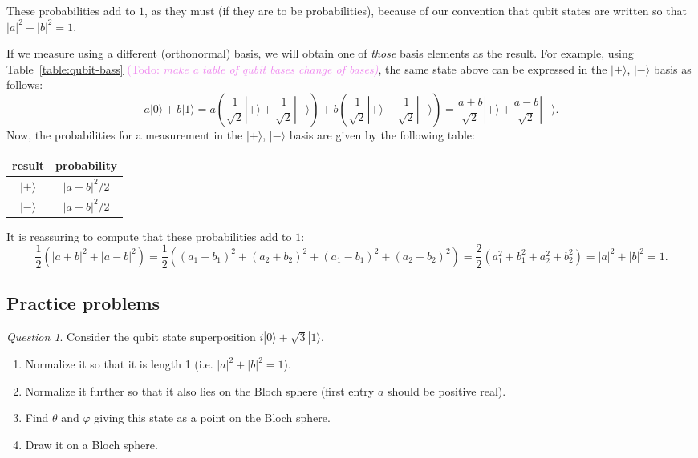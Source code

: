 \documentclass{article}
\theoremstyle{plain}
\theoremstyle{definition}
\theoremstyle{remark}
\newtheorem{question}[theorem]{Question}
\numberwithin{theorem}{section}
\newcommand{\KS}[1]{\textcolor{violet}{{\sf (Todo:} {\sl{#1})}}}
\newcommand{\KS}[1]{}
\begin{document}
These probabilities add to $1$, as they must (if they are to be probabilities), because of our convention that qubit states are written so that $|a|^2 + |b|^2 = 1$.

If we measure using a different (orthonormal) basis, we will obtain one of \emph{those} basis elements as the result.  For example, using Table~\ref{table:qubit-bass} \KS{make a table of qubit bases change of bases}, the same state above can be expressed in the $|+\rangle$, $|-\rangle$ basis as follows:
\[
a | 0 \rangle + b | 1 \rangle = 
a\left(  \frac{1}{\sqrt{2} }|+\rangle + \frac{1}{\sqrt{2}} |-\rangle \right) +
b\left(  \frac{1}{\sqrt{2} }|+\rangle - \frac{1}{\sqrt{2}} |-\rangle \right)
=
\frac{a+b}{\sqrt{2}} |+\rangle + 
\frac{a-b}{\sqrt{2}} |-\rangle.
\]
Now, the probabilities for a measurement in the $|+\rangle$, $|-\rangle$ basis are given by the following table:
\begin{center}

\begin{tabular}{cc}
result & probability \\
\hline
$|+\rangle$ & $|a+b|^2/2$ \\
$|-\rangle$ & $|a-b|^2/2$ \\
\end{tabular}

\end{center}

It is reassuring to compute that these probabilities add to $1$:
\[
\frac{1}{2} \left(
|a+b|^2 + |a-b|^2
\right)
=
\frac{1}{2} \left(
(a_1+b_1)^2 + (a_2 + b_2)^2 + (a_1 - b_1)^2 + (a_2 - b_2)^2
\right)
=
\frac{2}{2} \left(
a_1^2+b_1^2 + a_2^2 + b_2^2
\right)
=
|a|^2 + |b|^2
=1.
\]

\subsection{Practice problems}

\begin{question}
Consider the qubit state superposition $i|0\rangle + \sqrt{3}|1 \rangle$.
\begin{enumerate}
    \item Normalize it so that it is length 1 (i.e. $|a|^2 + |b|^2 = 1$).
\item Normalize it further so that it also lies on the Bloch sphere (first entry $a$ should be positive real).
\item Find $\theta$ and $\varphi$ giving this state as a point on the Bloch sphere.
\item Draw it on a Bloch sphere.
\end{enumerate}
\end{question}
\end{document}
